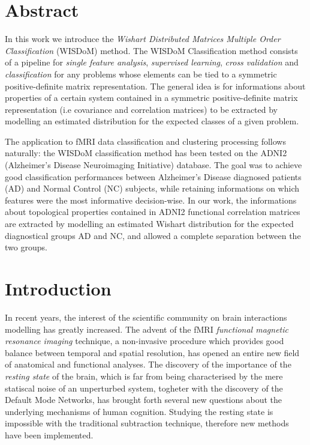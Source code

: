 \documentclass[12pt,openright,twoside,a4paper]{book}
\begin{document}


\frontmatter

\tableofcontents

\chapter{Abstract}

In this work we introduce the \textit{Wishart Distributed Matrices Multiple Order Classification} (WISDoM) method.
The WISDoM Classification method consists of a pipeline for \textit{single feature analysis}, \textit{supervised learning}, \textit{cross validation} and\textit{ classification} for any problems whose elements can be tied to a symmetric positive-definite matrix representation.
The general idea is for informations about properties of a certain system contained in a symmetric positive-definite matrix representation (i.e covariance and correlation matrices) to be extracted by modelling an estimated distribution for the expected classes of a given problem.

The application to fMRI data classification and clustering processing follows naturally: the WISDoM classification method has been tested on the ADNI2 (Alzheimer's Disease Neuroimaging Initiative) database.
The goal was to achieve good classification performances between  Alzheimer's Disease diagnosed patients (AD) and Normal Control (NC) subjects, while retaining informations on which features were the most informative decision-wise.
In our work, the informations about topological properties contained in ADNI2 functional correlation matrices are extracted by modelling an estimated Wishart distribution for the expected diagnostical groups AD and NC, and allowed a complete separation between the two groups.


\chapter{Introduction}

In recent years, the  interest of the scientific community on brain interactions modelling has greatly increased.
The advent of the fMRI \textit{functional magnetic resonance imaging} technique, a non-invasive procedure which provides good balance between temporal and spatial resolution, has opened an entire new field of anatomical and functional analyses.
The discovery of the importance of the \textit{resting state} of the brain, which is far from being characterised by the mere statiscal noise of an unperturbed system, togheter with the discovery of the Default Mode Networks, has brought forth several new questions about the underlying mechanisms of human cognition.
Studying the resting state is impossible with the traditional subtraction technique, therefore new methods have been implemented.
\end{document}
